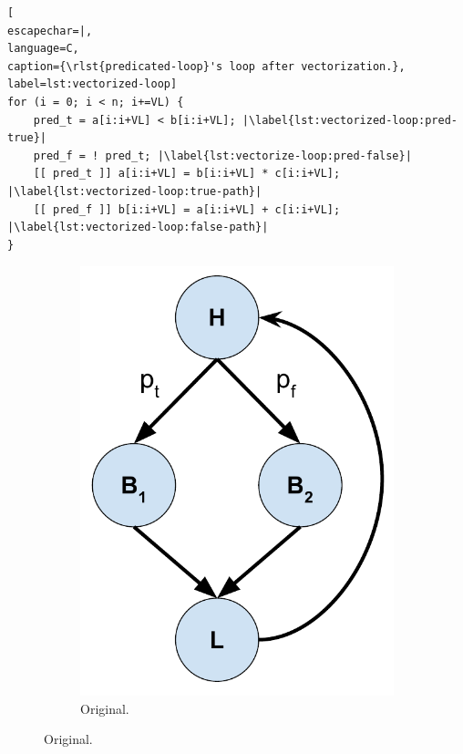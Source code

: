 \begin{lstlisting}[
escapechar=|,
language=C,
caption={\rlst{predicated-loop}'s loop after vectorization.}, label=lst:vectorized-loop]
for (i = 0; i < n; i+=VL) {
    pred_t = a[i:i+VL] < b[i:i+VL]; |\label{lst:vectorized-loop:pred-true}|
    pred_f = ! pred_t; |\label{lst:vectorize-loop:pred-false}|
    [[ pred_t ]] a[i:i+VL] = b[i:i+VL] * c[i:i+VL]; |\label{lst:vectorized-loop:true-path}|
    [[ pred_f ]] b[i:i+VL] = a[i:i+VL] + c[i:i+VL]; |\label{lst:vectorized-loop:false-path}|
}
\end{lstlisting}
\fi

\begin{figure}
     \centering
     \begin{subfigure}[b]{0.3225\columnwidth}
         \centering
         \includegraphics[width=\textwidth]{Figures/02-background/simple-loop-cfg.pdf}
         \caption{Original.}
         \label{fig:simple-loop-cfg}
     \end{subfigure}

\end{figure}
